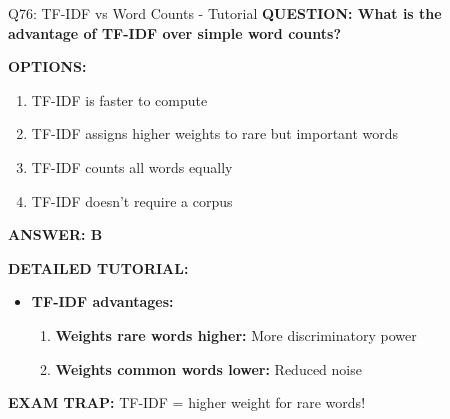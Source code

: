 \documentclass[8pt]{beamer}
\begin{document}
	\begin{frame}{Q76: TF-IDF vs Word Counts - Tutorial}
		\fontsize{6.5}{7.5}\selectfont
		\textbf{QUESTION: What is the advantage of TF-IDF over simple word counts?}
		
		\vspace{0.1cm}
		\textbf{OPTIONS:}
		\begin{enumerate}
			\item TF-IDF is faster to compute
			\item TF-IDF assigns higher weights to rare but important words
			\item TF-IDF counts all words equally
			\item TF-IDF doesn't require a corpus
		\end{enumerate}
		
		\vspace{0.1cm}
		\textcolor{myblue}{\textbf{ANSWER: B}}
		
		\vspace{0.1cm}
		\textbf{DETAILED TUTORIAL:}
		\begin{itemize}
			\item \textbf{TF-IDF advantages:}
			\begin{enumerate}
				\item \textbf{Weights rare words higher:} More discriminatory power
				\item \textbf{Weights common words lower:} Reduced noise
			\end{enumerate}
		\end{itemize}
		
		\textcolor{myred}{\textbf{EXAM TRAP:}} TF-IDF = \textcolor{myblue}{higher weight for rare words}!
	\end{frame}
	
\end{document}
